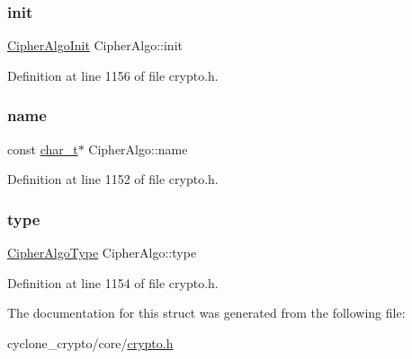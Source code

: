 \subsubsection{\texorpdfstring{init}{init}}
{\footnotesize\ttfamily \hyperlink{cyclone__crypto_2core_2crypto_8h_a1a0f02cdb8a3295caa1b87db2785e678}{Cipher\+Algo\+Init} Cipher\+Algo\+::init}



Definition at line 1156 of file crypto.\+h.

\mbox{\label{structCipherAlgo_ab0420cb1d17679c994059ddfd73df6ee}} 
\subsubsection{\texorpdfstring{name}{name}}
{\footnotesize\ttfamily const \hyperlink{compiler__port_8h_a40bb5262bf908c328fbcfbe5d29d0201}{char\+\_\+t}$\ast$ Cipher\+Algo\+::name}



Definition at line 1152 of file crypto.\+h.

\mbox{\label{structCipherAlgo_a840c614fa1ae0f98a9350bc4f040dc7a}} 
\subsubsection{\texorpdfstring{type}{type}}
{\footnotesize\ttfamily \hyperlink{cyclone__crypto_2core_2crypto_8h_ae03a6c8f32ed798857924d908aacc49b}{Cipher\+Algo\+Type} Cipher\+Algo\+::type}



Definition at line 1154 of file crypto.\+h.



The documentation for this struct was generated from the following file\+:\begin{DoxyCompactItemize}
\item 
cyclone\+\_\+crypto/core/\hyperlink{cyclone__crypto_2core_2crypto_8h}{crypto.\+h}\end{DoxyCompactItemize}
